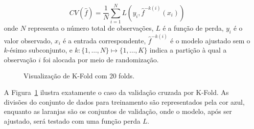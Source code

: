 \documentclass[
  12pt,
  a4paper,
]{scrreprt}
\begin{document}
\[
CV\left(\hat f\right) = \frac{1}{N}\sum_{i = 1}^N L\left(y_i, \hat{f}^{-k\left(i\right)}\left(x_i\right)\right)
\] onde \(N\) representa o número total de observações, \(L\) é a função
de perda, \(y_i\) é o valor observado, \(x_i\) é a entrada
correspondente, \(\hat{f}^{-k(i)}\) é o modelo ajustado sem o
\(k\)-ésimo subconjunto, e
\(k: \{1, \dots, N\} \mapsto \{1, \dots, K\}\) indica a partição à qual
a observação \(i\) foi alocada por meio de randomização.

\begin{figure}


\caption{\label{fig-kfold}Visualização de K-Fold com 20 folds.}

\end{figure}%

\vspace{12pt}

A Figura~\ref{fig-kfold} ilustra exatamente o caso da validação cruzada
por K-Fold. As divisões do conjunto de dados para treinamento são
representados pela cor azul, enquanto as laranjas são os conjuntos de
validação, onde o modelo, após ser ajustado, será testado com uma função
perda \(L\).

\vspace{12pt}
\end{document}
